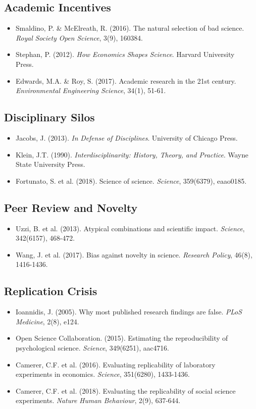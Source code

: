 \subsection{Academic Incentives}
\begin{itemize}[nosep]
\item Smaldino, P. \& McElreath, R. (2016). The natural selection of bad science. \textit{Royal Society Open Science}, 3(9), 160384.
\item Stephan, P. (2012). \textit{How Economics Shapes Science}. Harvard University Press.
\item Edwards, M.A. \& Roy, S. (2017). Academic research in the 21st century. \textit{Environmental Engineering Science}, 34(1), 51-61.
\end{itemize}

\subsection{Disciplinary Silos}
\begin{itemize}[nosep]
\item Jacobs, J. (2013). \textit{In Defense of Disciplines}. University of Chicago Press.
\item Klein, J.T. (1990). \textit{Interdisciplinarity: History, Theory, and Practice}. Wayne State University Press.
\item Fortunato, S. et al. (2018). Science of science. \textit{Science}, 359(6379), eaao0185.
\end{itemize}

\subsection{Peer Review and Novelty}
\begin{itemize}[nosep]
\item Uzzi, B. et al. (2013). Atypical combinations and scientific impact. \textit{Science}, 342(6157), 468-472.
\item Wang, J. et al. (2017). Bias against novelty in science. \textit{Research Policy}, 46(8), 1416-1436.
\end{itemize}

\subsection{Replication Crisis}
\begin{itemize}[nosep]
\item Ioannidis, J. (2005). Why most published research findings are false. \textit{PLoS Medicine}, 2(8), e124.
\item Open Science Collaboration. (2015). Estimating the reproducibility of psychological science. \textit{Science}, 349(6251), aac4716.
\item Camerer, C.F. et al. (2016). Evaluating replicability of laboratory experiments in economics. \textit{Science}, 351(6280), 1433-1436.
\item Camerer, C.F. et al. (2018). Evaluating the replicability of social science experiments. \textit{Nature Human Behaviour}, 2(9), 637-644.
\end{itemize}

